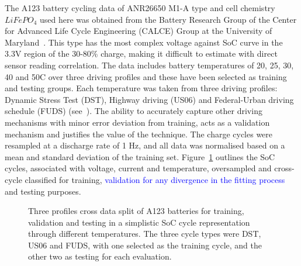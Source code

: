 %
%
{The A123 battery cycling data of ANR26650 M1-A type and cell chemistry $LiFePO_4$ used here was obtained from the Battery Research Group of the Center for Advanced Life Cycle Engineering (CALCE) Group at the University of Maryland~\cite{noauthor_calce_2017}.}
This type has the most complex voltage against SoC curve in the 3.3V region of the 30-80\% charge, making it difficult to estimate with direct sensor reading correlation.
The data includes battery temperatures of 20, 25, 30, 40 and 50\textdegree{}C over three driving profiles and these have been selected as training and testing groups.
Each temperature was taken from three driving profiles: Dynamic Stress Test (DST), Highway driving (US06) and Federal-Urban driving schedule (FUDS) (see~\cite{castillo_18_2015}).
The ability to accurately capture other driving mechanisms with minor error deviation from training, acts as a validation mechanism and justifies the value of the technique.
The charge cycles were resampled at a discharge rate of 1 Hz, and all data was normalised based on a mean and standard deviation of the training set.
Figure~\ref{fig:cross-data} outlines the SoC cycles, associated with voltage, current and temperature, oversampled and cross-cycle classified for training, \textcolor{blue}{validation for any divergence in the fitting process} and testing purposes.
\begin{figure}[ht]
    \centering
    
    \caption{Three profiles cross data split of A123 batteries for training, validation and testing in a simplistic SoC cycle representation through different temperatures. The three cycle types were DST, US06 and FUDS, with one selected as the training cycle, and the other two as testing for each evaluation.}
    \label{fig:cross-data}
\end{figure}

